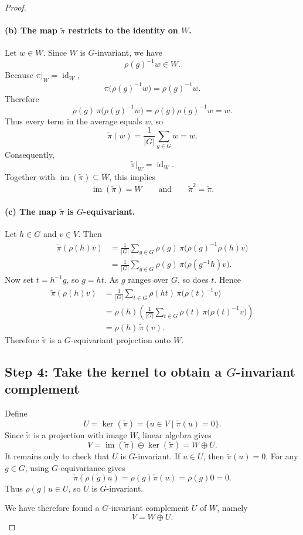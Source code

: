 \documentclass[12pt,a4paper]{article}
\theoremstyle{remark}
\begin{document}
\begin{proof}
\paragraph{(b) The map \(\widetilde{\pi}\) restricts to the identity on \(W\).}
Let \(w\in W\). Since \(W\) is \(G\)-invariant, we have
\[
  \rho(g)^{-1}w\in W.
\]
Because \(\pi|_W=\operatorname{id}_W\),
\[
  \pi\bigl(\rho(g)^{-1}w\bigr)=\rho(g)^{-1}w.
\]
Therefore
\[
  \rho(g)\,\pi\bigl(\rho(g)^{-1}w\bigr)
  =
  \rho(g)\rho(g)^{-1}w
  =
  w.
\]
Thus every term in the average equals \(w\), so
\[
  \widetilde{\pi}(w)
  =
  \frac{1}{|G|}
  \sum_{g\in G} w
  =
  w.
\]
Consequently,
\[
  \widetilde{\pi}|_W=\operatorname{id}_W.
\]
Together with \(\operatorname{im}(\widetilde{\pi})\subseteq W\), this implies
\[
  \operatorname{im}(\widetilde{\pi})=W
  \qquad\text{and}\qquad
  \widetilde{\pi}^2=\widetilde{\pi}.
\]

\paragraph{(c) The map \(\widetilde{\pi}\) is \(G\)-equivariant.}
Let \(h\in G\) and \(v\in V\). Then
\[
\begin{aligned}
  \widetilde{\pi}(\rho(h)v)
  &=
  \frac{1}{|G|}
  \sum_{g\in G}
  \rho(g)\,\pi\bigl(\rho(g)^{-1}\rho(h)v\bigr) \\
  &=
  \frac{1}{|G|}
  \sum_{g\in G}
  \rho(g)\,\pi\bigl(\rho(g^{-1}h)v\bigr).
\end{aligned}
\]
Now set \(t=h^{-1}g\), so \(g=ht\). As \(g\) ranges over \(G\), so does
\(t\). Hence
\[
\begin{aligned}
  \widetilde{\pi}(\rho(h)v)
  &=
  \frac{1}{|G|}
  \sum_{t\in G}
  \rho(ht)\,\pi\bigl(\rho(t)^{-1}v\bigr) \\
  &=
  \rho(h)
  \left(
  \frac{1}{|G|}
  \sum_{t\in G}
  \rho(t)\,\pi\bigl(\rho(t)^{-1}v\bigr)
  \right) \\
  &=
  \rho(h)\,\widetilde{\pi}(v).
\end{aligned}
\]
Therefore \(\widetilde{\pi}\) is a \(G\)-equivariant projection onto \(W\).

\subsection*{Step 4: Take the kernel to obtain a \(G\)-invariant complement}

Define
\[
  U=\ker(\widetilde{\pi})
  =
  \{u\in V\mid \widetilde{\pi}(u)=0\}.
\]
Since \(\widetilde{\pi}\) is a projection with image \(W\), linear algebra gives
\[
  V=\operatorname{im}(\widetilde{\pi})\oplus\ker(\widetilde{\pi})
  =
  W\oplus U.
\]
It remains only to check that \(U\) is \(G\)-invariant. If \(u\in U\), then
\(\widetilde{\pi}(u)=0\). For any \(g\in G\), using \(G\)-equivariance gives
\[
  \widetilde{\pi}(\rho(g)u)
  =
  \rho(g)\widetilde{\pi}(u)
  =
  \rho(g)0
  =
  0.
\]
Thus \(\rho(g)u\in U\), so \(U\) is \(G\)-invariant.

We have therefore found a \(G\)-invariant complement \(U\) of \(W\), namely
\[
  V=W\oplus U.
\]
\end{proof}
\end{document}
